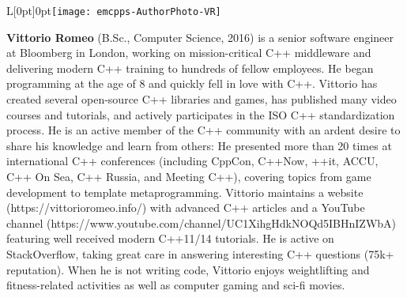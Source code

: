 \vspace*{18pt} %
\begin{wrapfigure}[11]{L}[0pt]{0pt}\texttt{[image: emcpps-AuthorPhoto-VR]}\end{wrapfigure}\noindent \textbf{Vittorio Romeo}  (B.Sc., Computer Science, 2016) is a senior software engineer at Bloomberg in London, working on mission-critical C++ middleware and delivering modern C++ training to hundreds of fellow employees. He began programming at the age of 8 and quickly fell in love with C++. Vittorio has created several open-source C++ libraries and games, has published many video courses and tutorials, and actively participates in the ISO C++ standardization process. He is an active member of the C++ community with an ardent desire to share his knowledge and learn from others: He presented more than 20 times at international C++ conferences (including CppCon, C++Now, ++it, ACCU, C++ On Sea, C++ Russia, and Meeting C++), covering topics from game development to template metaprogramming. Vittorio maintains a website (https://vittorioromeo.info/) with advanced C++ articles and a YouTube channel (https://www.youtube.com/channel/UC1XihgHdkNOQd5IBHnIZWbA) featuring well received modern C++11/14 tutorials. He is active on StackOverflow, taking great care in answering interesting C++ questions (75k+ reputation). When he is not writing code, Vittorio enjoys weightlifting and fitness-related activities as well as computer gaming and sci-fi movies.
